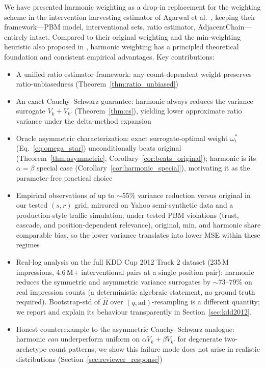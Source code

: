 \documentclass[sigconf]{acmart}
\begin{document}
We have presented harmonic weighting as a drop-in replacement for the weighting scheme in the intervention harvesting estimator of Agarwal et al.~\cite{agarwal2019estimating}, keeping their framework—PBM model, interventional sets, ratio estimator, AdjacentChain—entirely intact. Compared to their original weighting and the min-weighting heuristic also proposed in \cite{agarwal2019estimating}, harmonic weighting has a principled theoretical foundation and consistent empirical advantages. Key contributions:
\begin{itemize}
  \item A unified ratio estimator framework: any count-dependent weight preserves ratio-unbiasedness (Theorem~\ref{thm:ratio_unbiased})
  \item An exact Cauchy–Schwarz guarantee: harmonic always reduces the variance surrogate $V_k + V_{k'}$ (Theorem~\ref{thm:cs}), yielding lower approximate ratio variance under the delta-method expansion
  \item Oracle asymmetric characterization: exact surrogate-optimal weight $\omega_i^*$ (Eq.~\ref{eq:omega_star}) unconditionally beats original (Theorem~\ref{thm:asymmetric}, Corollary~\ref{cor:beats_original}); harmonic is its $\alpha{=}\beta$ special case (Corollary~\ref{cor:harmonic_special}), motivating it as the parameter-free practical choice
  \item Empirical observations of up to $\sim$55\% variance reduction versus original in our
        tested $(s, r)$ grid, mirrored on Yahoo semi-synthetic data and a production-style
        traffic simulation; under tested PBM violations (trust, cascade, and
        position-dependent relevance), original, min, and harmonic share comparable bias,
        so the lower variance translates into lower MSE within these regimes
  \item Real-log analysis on the full KDD Cup 2012 Track 2 dataset (235\,M
        impressions, 4.6\,M+ interventional pairs at a single position pair):
        harmonic reduces the symmetric and asymmetric variance surrogates by
        $\sim 73$--$79\%$ on real impression counts (a deterministic algebraic
        statement, no ground truth required). Bootstrap-std of $\hat R$ over
        $(q,\mathrm{ad})$-resampling is a different quantity; we report
        and explain its behaviour transparently in Section~\ref{sec:kdd2012}.
  \item Honest counterexample to the asymmetric Cauchy--Schwarz analogue: harmonic
        \emph{can} underperform uniform on $\alpha V_k+\beta V_{k'}$ for degenerate
        two-archetype count patterns; we show this failure mode does not arise in
        realistic distributions (Section~\ref{sec:reviewer_response})
\end{itemize}
\end{document}
